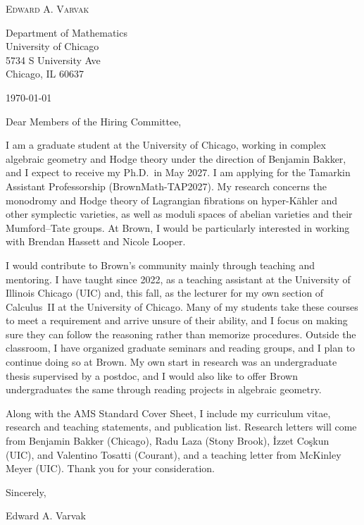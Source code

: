 \documentclass[12pt]{article}
\begin{document}
\begin{center}
  {\Large\textsc{Edward A. Varvak}}\\[10pt]
\end{center}

Department of Mathematics \\
University of Chicago \\
5734 S University Ave \\
Chicago, IL 60637

\today

Dear Members of the Hiring Committee,

I am a graduate student at the University of Chicago, working in complex
algebraic geometry and Hodge theory under the direction of Benjamin Bakker,
and I expect to receive my Ph.D.\ in May 2027. I am applying for the Tamarkin
Assistant Professorship (\mbox{BrownMath-TAP2027}). My research concerns the
monodromy and Hodge theory of Lagrangian fibrations on hyper-K\"ahler and
other symplectic varieties, as well as moduli spaces of abelian varieties and 
their Mumford--Tate groups. At Brown, I would be particularly interested in
working with Brendan Hassett and Nicole Looper.

I would contribute to Brown's community mainly through teaching and
mentoring. I have taught since 2022, as a teaching assistant at the
University of Illinois Chicago (UIC) and, this fall, as the lecturer for my
own section of Calculus~II at the University of Chicago. Many of my students
take these courses to meet a requirement and arrive unsure of their ability,
and I focus on making sure they can follow the reasoning rather than memorize
procedures. Outside the classroom, I have organized graduate seminars and
reading groups, and I plan to continue doing so at Brown. My own start in
research was an undergraduate thesis supervised by a postdoc, and I would
also like to offer Brown undergraduates the same through reading projects in
algebraic geometry.

Along with the AMS Standard Cover Sheet, I include my curriculum vitae,
research and teaching statements, and publication list. Research letters will
come from Benjamin Bakker (Chicago), Radu Laza (Stony Brook), \.{I}zzet
Co\c{s}kun (UIC), and Valentino Tosatti (Courant), and a teaching letter from
McKinley Meyer (UIC). Thank you for your consideration.

Sincerely,

Edward A. Varvak
\end{document}
